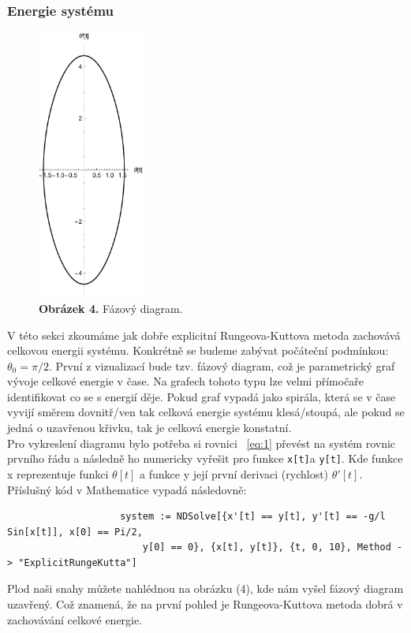\documentclass[reqno, a4paper]{amsart}
\begin{document}
				\subsubsection{Energie systému}
				\label{sec:sys-energy}
				\begin{figure}
					\includegraphics[width=3.5cm]{Runge - Kutta, Fazovy diagram}
					\caption*{\textbf{Obrázek 4.} Fázový diagram.}
				\end{figure}
				V této sekci zkoumáme jak dobře explicitní Rungeova-Kuttova metoda zachovává celkovou energii systému. Konkrétně se budeme zabývat počáteční podmínkou: $\theta_{0} = \pi /2$. První z vizualizací bude tzv. fázový diagram, což je parametrický graf vývoje celkové energie v čase. Na grafech tohoto typu lze velmi přímočaře identifikovat co se s energií děje. Pokud graf vypadá jako spirála, která se v čase vyvijí směrem dovnitř/ven tak celková energie systému klesá/stoupá, ale pokud se jedná o uzavřenou křivku, tak je celková energie konstatní.\\
				Pro vykreslení diagramu bylo potřeba si rovnici ~\eqref{eq:1} převést na systém rovnic prvního řádu a následně ho numericky vyřešit pro funkce \verb|x[t]|a \verb|y[t]|. Kde funkce x reprezentuje funkci $\theta [t]$ a funkce y její první derivaci (rychlost) $\theta' [t]$. Příslušný kód v Mathematice vypadá následovně:
				\begin{verbatim}
					system := NDSolve[{x'[t] == y[t], y'[t] == -g/l Sin[x[t]], x[0] == Pi/2,
						y[0] == 0}, {x[t], y[t]}, {t, 0, 10}, Method -> "ExplicitRungeKutta"]
				\end{verbatim}
				Plod naši snahy můžete nahlédnou na obrázku (4), kde nám vyšel fázový diagram uzavřený. Což znamená, že na první pohled je Rungeova-Kuttova metoda dobrá v zachovávání celkové energie.\\ \\
\end{document}
